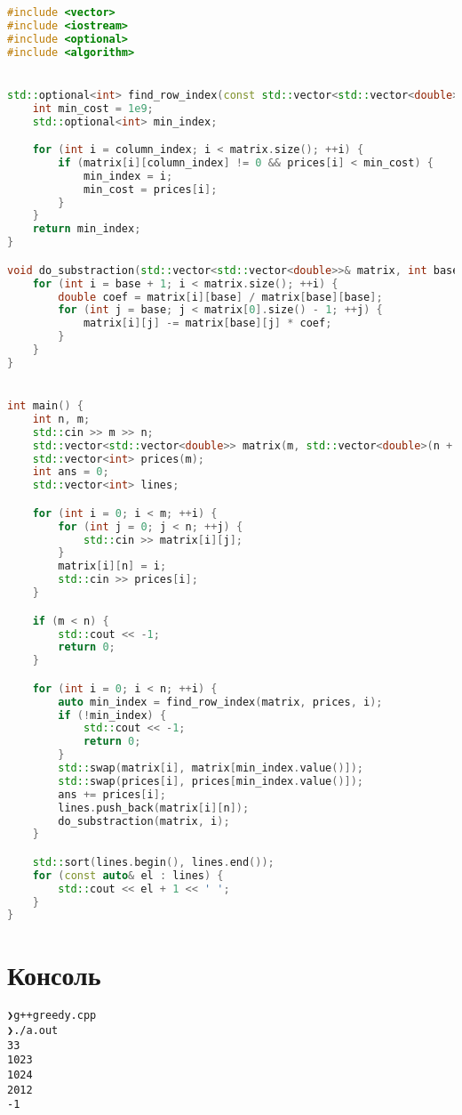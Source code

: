 \begin{lstlisting}[language=C++]
#include <vector>
#include <iostream>
#include <optional>
#include <algorithm>


std::optional<int> find_row_index(const std::vector<std::vector<double>>& matrix, const std::vector<int>& prices, int column_index) {
    int min_cost = 1e9;
    std::optional<int> min_index;

    for (int i = column_index; i < matrix.size(); ++i) {
        if (matrix[i][column_index] != 0 && prices[i] < min_cost) {
            min_index = i;
            min_cost = prices[i];
        }
    }
    return min_index;
}

void do_substraction(std::vector<std::vector<double>>& matrix, int base) {
    for (int i = base + 1; i < matrix.size(); ++i) {
        double coef = matrix[i][base] / matrix[base][base];
        for (int j = base; j < matrix[0].size() - 1; ++j) {
            matrix[i][j] -= matrix[base][j] * coef;
        }
    }
}


int main() {
    int n, m;
    std::cin >> m >> n;
    std::vector<std::vector<double>> matrix(m, std::vector<double>(n + 1));
    std::vector<int> prices(m);
    int ans = 0;
    std::vector<int> lines;

    for (int i = 0; i < m; ++i) {
        for (int j = 0; j < n; ++j) {
            std::cin >> matrix[i][j];
        }
        matrix[i][n] = i;
        std::cin >> prices[i];
    }

    if (m < n) {
        std::cout << -1;
        return 0;
    }

    for (int i = 0; i < n; ++i) {
        auto min_index = find_row_index(matrix, prices, i);
        if (!min_index) {
            std::cout << -1;
            return 0;
        }
        std::swap(matrix[i], matrix[min_index.value()]);
        std::swap(prices[i], prices[min_index.value()]);
        ans += prices[i];
        lines.push_back(matrix[i][n]);
        do_substraction(matrix, i);
    }

    std::sort(lines.begin(), lines.end());
    for (const auto& el : lines) {
        std::cout << el + 1 << ' ';
    }
}
\end{lstlisting}

\pagebreak

\section{Консоль}
\begin{alltt}
❯ g++ greedy.cpp
❯ ./a.out
3 3
1 0 2 3
1 0 2 4
2 0 1 2
-1%   
\end{alltt}
\pagebreak

